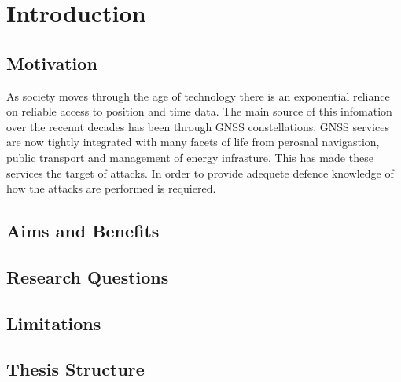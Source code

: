 
\chapter{Introduction}\label{chapter:firstchapter} %

\label{Chapter1} %

\section{Motivation}\label{sec:Motivation}


As society moves through the age of technology there is an exponential reliance on reliable access to position and time data. The main source of this infomation over the
recennt decades has been through GNSS constellations. GNSS services are now tightly integrated with many facets of life from perosnal navigastion, public transport and
management of
energy infrasture. This has made these services the target of attacks. In order to provide adequete defence knowledge of how the attacks are performed is requiered.

\section{Aims and Benefits}\label{sec:Aims}

\section{Research Questions}\label{sec:RQs}

\section{Limitations}\label{sec:Limits}

\section{Thesis Structure}\label{sec:structure}